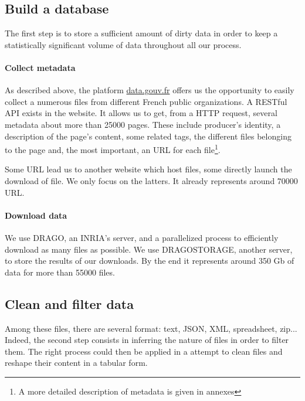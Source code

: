 \documentclass[a4paper]{article}
\begin{document}
	
	\subsection{Build a database}
	
	The first step is to store a sufficient amount of dirty data in order to keep a statistically significant volume of data throughout all our process.
	
	\paragraph{Collect metadata}
	
	As described above, the platform \href{http://www.data.gouv.fr/fr/}{data.gouv.fr} offers us the opportunity to easily collect a numerous files from different French public organizations. A RESTful API exists in the website. It allows us to get, from a HTTP request, several metadata about more than 25000 pages. These include producer's identity, a description of the page's content, some related tags, the different files belonging to the page and, the most important, an URL for each file\footnote{A more detailed description of metadata is given in annexes}. 
	
	Some URL lead us to another website which host files, some directly launch the download of file. We only focus on the latters. It already represents around 70000 URL.
	
	\paragraph{Download data}
	
	We use DRAGO, an INRIA's server, and a parallelized process to efficiently download as many files as possible. We use DRAGOSTORAGE, another server, to store the results of our downloads. By the end it represents around 350 Gb of data for more than 55000 files.
	
	\subsection{Clean and filter data}
	
	Among these files, there are several format: text, JSON, XML, spreadsheet, zip... Indeed, the second step consists in inferring the nature of files in order to filter them. The right process could then be applied in a attempt to clean files and reshape their content in a tabular form.
	
\end{document}
